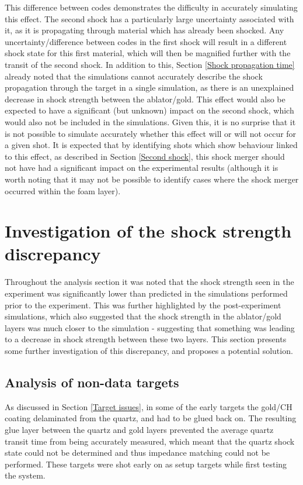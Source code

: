 This difference between codes demonstrates the difficulty in accurately simulating this effect. The second shock has a particularly large uncertainty associated with it, as it is propagating through material which has already been shocked. Any uncertainty/difference between codes in the first shock will result in a different shock state for this first material, which will then be magnified further with the transit of the second shock. In addition to this, Section \ref{Shock propagation time} already noted that the simulations cannot accurately describe the shock propagation through the target in a single simulation, as there is an unexplained decrease in shock strength between the ablator/gold. This effect would also be expected to have a significant (but unknown) impact on the second shock, which would also not be included in the simulations. Given this, it is no surprise that it is not possible to simulate accurately whether this effect will or will not occur for a given shot. It is expected that by identifying shots which show behaviour linked to this effect, as described in Section \ref{Second shock}, this shock merger should not have had a significant impact on the experimental results (although it is worth noting that it may not be possible to identify cases where the shock merger occurred within the foam layer).

\section{Investigation of the shock strength discrepancy} \label{Weak quartz shock}

Throughout the analysis section it was noted that the shock strength seen in the experiment was significantly lower than predicted in the simulations performed prior to the experiment. This was further highlighted by the post-experiment simulations, which also suggested that the shock strength in the ablator/gold layers was much closer to the simulation - suggesting that something was leading to a decrease in shock strength between these two layers. This section presents some further investigation of this discrepancy, and proposes a potential solution.

\subsection{Analysis of non-data targets} \label{Non-data targets}

As discussed in Section \ref{Target issues}, in some of the early targets the gold/CH coating delaminated from the quartz, and had to be glued back on. The resulting glue layer between the quartz and gold layers prevented the average quartz transit time from being accurately measured, which meant that the quartz shock state could not be determined and thus impedance matching could not be performed. These targets were shot early on as setup targets while first testing the system. 

